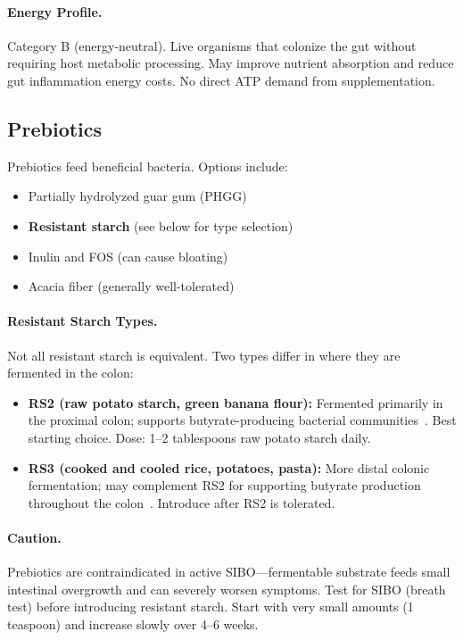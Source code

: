 \paragraph{Energy Profile.}
Category B (energy-neutral). Live organisms that colonize the gut without requiring host metabolic processing. May improve nutrient absorption and reduce gut inflammation energy costs. No direct ATP demand from supplementation.

\subsection{Prebiotics}

Prebiotics feed beneficial bacteria. Options include:
\begin{itemize}
    \item Partially hydrolyzed guar gum (PHGG)
    \item \textbf{Resistant starch} (see below for type selection)
    \item Inulin and FOS (can cause bloating)
    \item Acacia fiber (generally well-tolerated)
\end{itemize}

\paragraph{Resistant Starch Types.} Not all resistant starch is equivalent. Two types differ in where they are fermented in the colon:
\begin{itemize}
    \item \textbf{RS2 (raw potato starch, green banana flour):} Fermented primarily in the proximal colon; supports butyrate-producing bacterial communities~\cite{ButyrateDeficiency2023}. Best starting choice. Dose: 1--2 tablespoons raw potato starch daily.
    \item \textbf{RS3 (cooked and cooled rice, potatoes, pasta):} More distal colonic fermentation; may complement RS2 for supporting butyrate production throughout the colon~\cite{ButyrateDeficiency2023}. Introduce after RS2 is tolerated.
\end{itemize}

\paragraph{Caution.} Prebiotics are contraindicated in active SIBO---fermentable substrate feeds small intestinal overgrowth and can severely worsen symptoms. Test for SIBO (breath test) before introducing resistant starch. Start with very small amounts (1 teaspoon) and increase slowly over 4--6 weeks.


